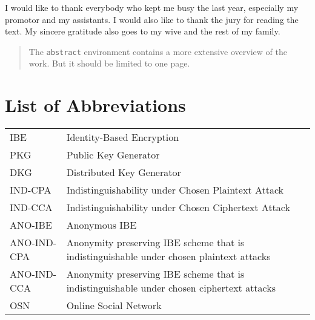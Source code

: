 \documentclass[master=eelt,masteroption=em]{kulemt}
\theoremstyle{plain}
\theoremstyle{definition}
\begin{document}

\begin{preface}
  I would like to thank everybody who kept me busy the last year,
  especially my promotor and my assistants. I would also like to thank the
  jury for reading the text. My sincere gratitude also goes to my wive and
  the rest of my family.
\end{preface}

\tableofcontents*

\begin{abstract}
  The \texttt{abstract} environment contains a more extensive overview of
  the work. But it should be limited to one page.

  \lipsum[1]
\end{abstract}

\listoffiguresandtables
\chapter{List of Abbreviations}
\begin{flushleft}
  \renewcommand{\arraystretch}{1.1}
  \begin{tabularx}{\textwidth}{@{}p{30mm}X@{}}
    IBE   & Identity-Based Encryption \\
    PKG   & Public Key Generator \\
    DKG   & Distributed Key Generator \\
    IND-CPA  & Indistinguishability under Chosen Plaintext Attack  \\
    IND-CCA & Indistinguishability under Chosen Ciphertext Attack \\
    ANO-IBE & Anonymous IBE \\
    ANO-IND-CPA & Anonymity preserving IBE scheme that is indistinguishable under chosen plaintext attacks \\
    ANO-IND-CCA & Anonymity preserving IBE scheme that is indistinguishable under chosen ciphertext attacks \\ 
    OSN & Online Social Network \\
  \end{tabularx}
\end{flushleft}
\end{document}
